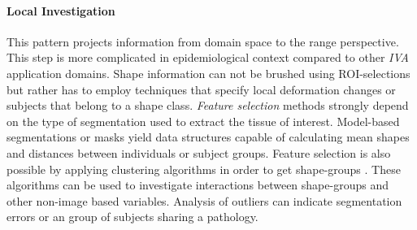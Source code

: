\documentclass[journal]{style/vgtc} 			          %
\begin{document}
\paragraph{Local Investigation}
This pattern projects information from domain space to the range perspective.
%
This step is more complicated in epidemiological context compared to other \emph{IVA} application domains.
%
Shape information can not be brushed using ROI-selections but rather has to employ techniques that specify local deformation changes \cite{Hermann2014} or subjects that belong to a shape class.
%
\emph{Feature selection} methods strongly depend on the type of segmentation used to extract the tissue of interest.
%
Model-based segmentations or masks yield data structures capable of calculating mean shapes and distances between individuals or subject groups.
%
Feature selection is also possible by applying clustering algorithms in order to get shape-groups \cite{Klemm2013VMV}.
%
These algorithms can be used to investigate interactions between shape-groups and other non-image based variables.
%
Analysis of outliers can indicate segmentation errors or an group of subjects sharing a pathology.
%
%



\end{document}
